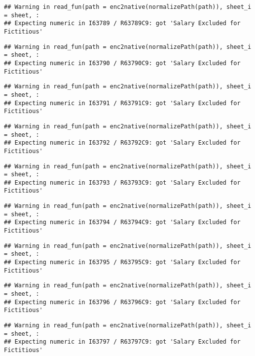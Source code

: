 \documentclass[
]{article}
\begin{document}
\begin{verbatim}
## Warning in read_fun(path = enc2native(normalizePath(path)), sheet_i = sheet, :
## Expecting numeric in I63789 / R63789C9: got 'Salary Excluded for Fictitious'
\end{verbatim}

\begin{verbatim}
## Warning in read_fun(path = enc2native(normalizePath(path)), sheet_i = sheet, :
## Expecting numeric in I63790 / R63790C9: got 'Salary Excluded for Fictitious'
\end{verbatim}

\begin{verbatim}
## Warning in read_fun(path = enc2native(normalizePath(path)), sheet_i = sheet, :
## Expecting numeric in I63791 / R63791C9: got 'Salary Excluded for Fictitious'
\end{verbatim}

\begin{verbatim}
## Warning in read_fun(path = enc2native(normalizePath(path)), sheet_i = sheet, :
## Expecting numeric in I63792 / R63792C9: got 'Salary Excluded for Fictitious'
\end{verbatim}

\begin{verbatim}
## Warning in read_fun(path = enc2native(normalizePath(path)), sheet_i = sheet, :
## Expecting numeric in I63793 / R63793C9: got 'Salary Excluded for Fictitious'
\end{verbatim}

\begin{verbatim}
## Warning in read_fun(path = enc2native(normalizePath(path)), sheet_i = sheet, :
## Expecting numeric in I63794 / R63794C9: got 'Salary Excluded for Fictitious'
\end{verbatim}

\begin{verbatim}
## Warning in read_fun(path = enc2native(normalizePath(path)), sheet_i = sheet, :
## Expecting numeric in I63795 / R63795C9: got 'Salary Excluded for Fictitious'
\end{verbatim}

\begin{verbatim}
## Warning in read_fun(path = enc2native(normalizePath(path)), sheet_i = sheet, :
## Expecting numeric in I63796 / R63796C9: got 'Salary Excluded for Fictitious'
\end{verbatim}

\begin{verbatim}
## Warning in read_fun(path = enc2native(normalizePath(path)), sheet_i = sheet, :
## Expecting numeric in I63797 / R63797C9: got 'Salary Excluded for Fictitious'
\end{verbatim}
\end{document}
